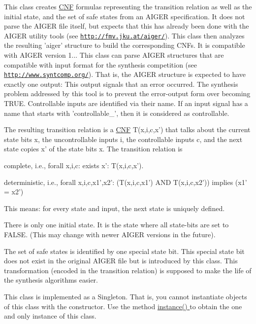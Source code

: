 This class creates \hyperlink{classCNF}{C\-N\-F} formulas representing the transition relation as well as the initial state, and the set of safe states from an A\-I\-G\-E\-R specification. It does not parse the A\-I\-G\-E\-R file itself, but expects that this has already been done with the A\-I\-G\-E\-R utility tools (see \href{http://fmv.jku.at/aiger/}{\tt http\-://fmv.\-jku.\-at/aiger/}). This class then analyzes the resulting 'aiger' structure to build the corresponding C\-N\-Fs. It is compatible with A\-I\-G\-E\-R version 1... This class can parse A\-I\-G\-E\-R structures that are compatible with input format for the synthesis competition (see \href{http://www.syntcomp.org/}{\tt http\-://www.\-syntcomp.\-org/}). That is, the A\-I\-G\-E\-R structure is expected to have exactly one output\-: This output signals that an error occurred. The synthesis problem addressed by this tool is to prevent the error-\/output form over becoming T\-R\-U\-E. Controllable inputs are identified via their name. If an input signal has a name that starts with 'controllable\-\_\-', then it is considered as controllable.

The resulting transition relation is a \hyperlink{classCNF}{C\-N\-F} T(x,i,c,x') that talks about the current state bits x, the uncontrollable inputs i, the controllable inputs c, and the next state copies x' of the state bits x. The transition relation is 
\begin{DoxyItemize}
\item complete, i.\-e., forall x,i,c\-: exists x'\-: T(x,i,c,x'). 
\item deterministic, i.\-e., forall x,i,c,x1',x2'\-: (T(x,i,c,x1') A\-N\-D T(x,i,c,x2')) implies (x1' = x2') 
\end{DoxyItemize}This means\-: for every state and input, the next state is uniquely defined.

There is only one initial state. It is the state where all state-\/bits are set to F\-A\-L\-S\-E. (This may change with newer A\-I\-G\-E\-R versions in the future).

The set of safe states is identified by one special state bit. This special state bit does not exist in the original A\-I\-G\-E\-R file but is introduced by this class. This transformation (encoded in the transition relation) is supposed to make the life of the synthesis algorithms easier.

This class is implemented as a Singleton. That is, you cannot instantiate objects of this class with the constructor. Use the method \hyperlink{classAIG2CNF_a7a4db833018cb851ab608004b4e651e4}{instance() } to obtain the one and only instance of this class.

